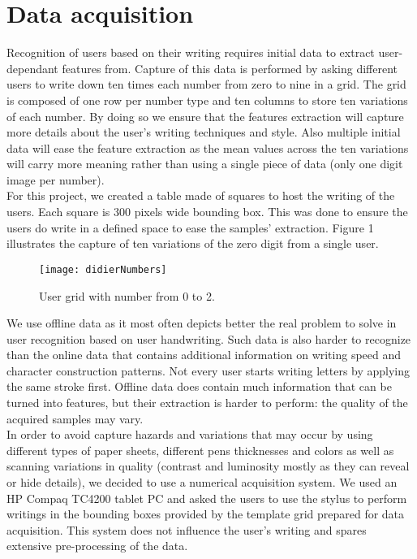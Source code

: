 \documentclass[a4paper]{article}
\begin{document}
{\section{Data acquisition}

Recognition of users based on their writing requires initial data to extract user-dependant features from. Capture of this data is performed by asking different users to write down ten times each number from zero to nine in a grid. The grid is composed of one row per number type and ten columns to store ten variations of each number. By doing so we ensure that the features extraction will capture more details about the user’s writing techniques and style. Also multiple initial data will ease the feature extraction as the mean values across the ten variations will carry more meaning rather than using a single piece of data (only one digit image per number).\\

For this project, we created a table made of squares to host the writing of the users. Each square is 300 pixels wide bounding box. This was done to ensure the users do write in a defined space to ease the samples’ extraction. Figure 1 illustrates the capture of ten variations of the zero digit from a single user.

\vspace{1mm}
\begin{figure}[h!]
  \caption{User grid with number from 0 to 2.}
  \centering
    \texttt{[image: didierNumbers]}
\end{figure}

We use offline data as it most often depicts better the real problem to solve in user recognition based on user handwriting. Such data is also harder to recognize than the online data that contains additional information on writing speed and character construction patterns. Not every user starts writing letters by applying the same stroke first. Offline data does contain much information that can be turned into features, but their extraction is harder to perform: the quality of the acquired samples may vary.\\

In order to avoid capture hazards and variations that may occur by using different types of paper sheets, different pens thicknesses and colors as well as scanning variations in quality (contrast and luminosity mostly as they can reveal or hide details), we decided to use a numerical acquisition system. We used an HP Compaq TC4200 tablet PC and asked the users to use the stylus to perform writings in the bounding boxes provided by the template grid prepared for data acquisition. This system does not influence the user’s writing and spares extensive pre-processing of the data.\\

}
\end{document}
